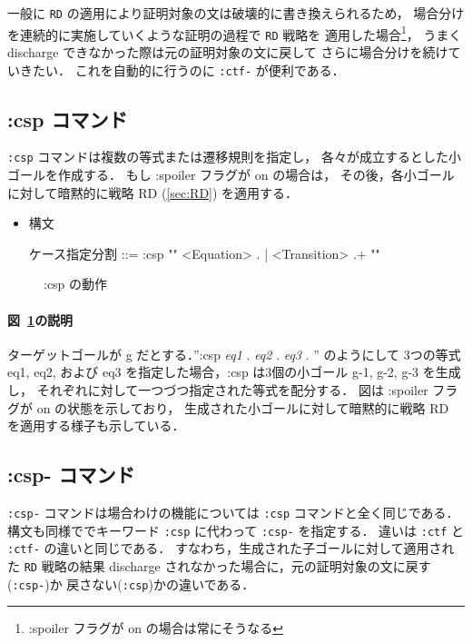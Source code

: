 \documentclass[a4paper,oneside,10pt,here]{memoir}
\newenvironment{vvtm}%
{\parskip=0pt\lineskip=0pt\begin{center}\begin{minipage}{0.8\textwidth}\begin{snugshade}}%
  {\end{snugshade}\end{minipage}\end{center}}
\begin{document}
一般に \texttt{RD} の適用により証明対象の文は破壊的に書き換えられるため，
場合分けを連続的に実施していくような証明の過程で \texttt{RD} 戦略を
適用した場合\footnote{:spoiler フラグが on の場合は常にそうなる}，
うまく discharge できなかった際は元の証明対象の文に戻して
さらに場合分けを続けていきたい．
これを自動的に行うのに \texttt{:ctf-} が便利である．

\subsection{:csp コマンド}\label{sec:csp}
\texttt{:csp} コマンドは複数の等式または遷移規則を指定し，
各々が成立するとした小ゴールを作成する．
もし :spoiler フラグが on の場合は，
その後，各小ゴールに対して暗黙的に戦略 RD (\ref{sec:RD}) を適用する．

\begin{itemize}
\item 構文
  \begin{vvtm}
    \begin{simplev}
      ケース指定分割 ::= :csp "{" { <Equation> . | <Transition> .}+ "}"
    \end{simplev}
  \end{vvtm}
\end{itemize}

\begin{figure}[hbt]
  \centering
  
  \caption{:csp の動作}
  \label{fig:csp}
\end{figure}

\paragraph{図~\ref{fig:csp}の説明}
ターゲットゴールが g だとする．”:csp { \textit{eq1} . \textit{eq2} . \textit{eq3} . }” のようにして
3つの等式 eq1, eq2, および eq3 を指定した場合，:csp は3個の小ゴール g-1, g-2, g-3 を生成し，
それぞれに対して一つづつ指定された等式を配分する．
図は :spoiler フラグが on の状態を示しており，
生成された小ゴールに対して暗黙的に戦略 RD を適用する様子も示している．

\subsection{:csp- コマンド}\label{sec:csp-}
\texttt{:csp-} コマンドは場合わけの機能については \texttt{:csp} コマンドと全く同じである．
構文も同様ででキーワード \texttt{:csp} に代わって \texttt{:csp-} を指定する．
違いは \texttt{:ctf} と \texttt{:ctf-} の違いと同じである．
すなわち，生成された子ゴールに対して適用された \texttt{RD} 戦略の結果
discharge されなかった場合に，元の証明対象の文に戻す(\texttt{:csp-})か
戻さない(\texttt{:csp})かの違いである．
\end{document}
